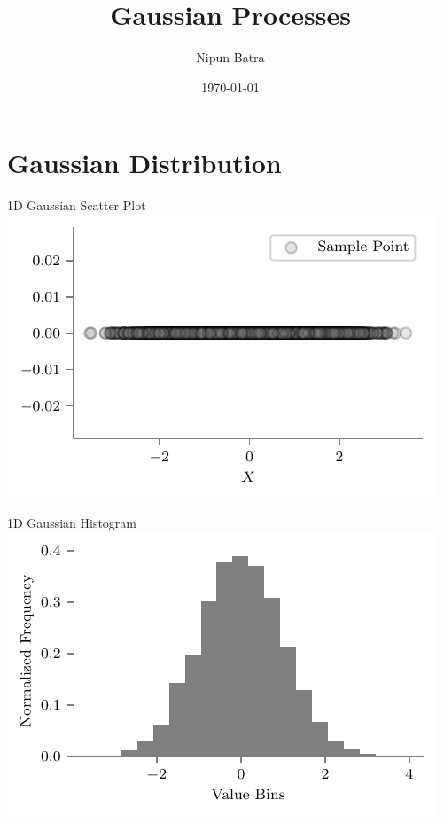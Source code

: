 \documentclass{beamer}
\title{Gaussian Processes}
\date{\today}
\author{Nipun Batra}
\institute{IIT Gandhinagar}
\begin{document}
	\maketitle
	
	
	
	\section{Gaussian Distribution}
	\begin{frame}{1D Gaussian Scatter Plot}
		\includegraphics[width=\linewidth,height=\textheight,keepaspectratio]{gp/1d-gp}
	\end{frame}
	
	\begin{frame}{1D Gaussian Histogram}
		\includegraphics[width=\linewidth,height=\textheight,keepaspectratio]{gp/1d-gp-hist}
	\end{frame}
	
\end{document}
